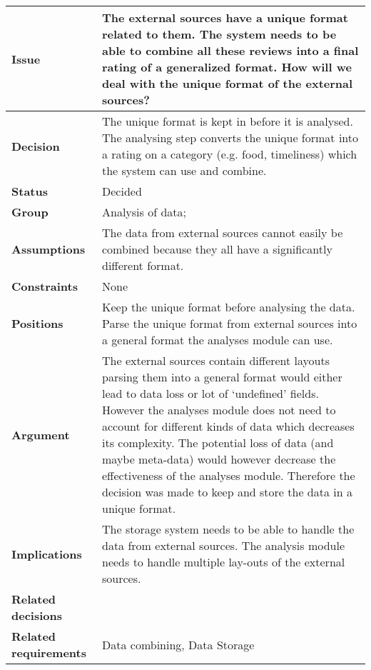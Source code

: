 
\label{dd:data-format}
{\large{}}
\begin{tabular}{ l  p{10cm}}
\hline
\bf Issue & The external sources have a unique format related to them. The system needs to be able to combine all these reviews into a final rating of a generalized format. How will we deal with the unique format of the external sources? \\
\hline
\bf Decision & The unique format is kept in before it is analysed. The analysing step converts the unique format into a rating on a category (e.g. food, timeliness) which the system can use and combine. \\
\hline
\bf Status & Decided \\
\hline
\bf Group & Analysis of data; \\
\hline
\bf Assumptions & The data from external sources cannot easily be combined because they all have a significantly different format. \\
\hline
\bf Constraints & None \\
\hline
\bf Positions & Keep the unique format before analysing the data. \newline\newline
Parse the unique format from external sources into a general format the analyses module can use. \\
\hline
\bf Argument & The external sources contain different layouts parsing them into a general format would either lead to data loss or lot of ‘undefined’ fields. However the analyses module does not need to account for different kinds of data which decreases its complexity. The potential loss of data (and maybe meta-data) would however decrease the effectiveness of the analyses module. Therefore the decision was made to keep and store the data in a unique format. \\
\hline
\bf Implications & The storage system needs to be able to handle the data from external sources. The analysis module needs to handle multiple lay-outs of the external sources. \\
\hline
\bf Related decisions & \\
\hline
\bf Related requirements & Data combining, Data Storage \\
\hline
\end{tabular}
